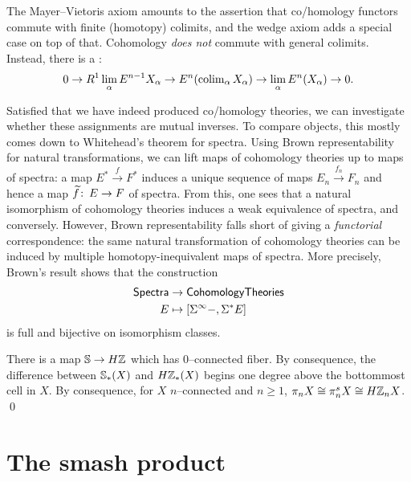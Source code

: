\begin{remark}
The Mayer--Vietoris axiom amounts to the assertion that co/homology functors commute with finite (homotopy) colimits, and the wedge axiom adds a special case on top of that.
Cohomology \emph{does not} commute with general colimits.%
Instead, there is a : \[0 \to R^1 \lim_\alpha E^{n-1} X_\alpha \to E^n(\colim_\alpha X_\alpha) \to \lim_\alpha E^n(X_\alpha) \to 0.\]
\end{remark}

Satisfied that we have indeed produced co/homology theories, we can investigate whether these assignments are mutual inverses.
To compare objects, this mostly comes down to Whitehead's theorem for spectra.
Using Brown representability for natural transformations, we can lift maps of cohomology theories up to maps of spectra: a map $E^* \xrightarrow f F^*$ induces a unique sequence of maps $E_n \xrightarrow{f_n} F_n$ and hence a map $\widetilde f\co E \to F$ of spectra.%
From this, one sees that a natural isomorphism of cohomology theories induces a weak equivalence of spectra, and conversely.
However, Brown representability falls short of giving a \emph{functorial} correspondence: the same natural transformation of cohomology theories can be induced by multiple homotopy-inequivalent maps of spectra.
More precisely, Brown's result shows that the construction
\begin{align*}
\CatOf{Spectra} & \to \CatOf{CohomologyTheories} \\
E & \mapsto [\Susp^\infty - , \Susp^* E]
\end{align*}
is full and bijective on isomorphism classes.

\begin{theorem}[Hurewicz]
There is a map $\S \to H\Z$ which has $0$--connected fiber.
By consequence, the difference between $\S_*(X)$ and $H\Z_*(X)$ begins one degree above the bottommost cell in $X$.
By consequence, for $X$ $n$--connected and $n \ge 1$, $\pi_n X \cong \pi_n^s X \cong H\Z_n X$. \qed
\end{theorem}




\section{The smash product}

